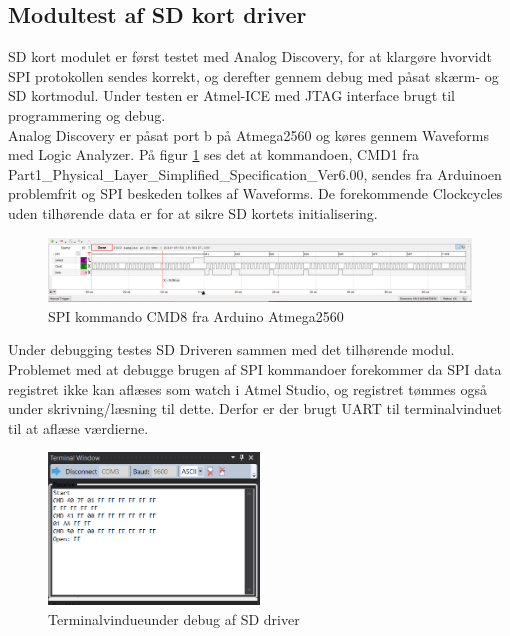 \subsection{Modultest af SD kort driver}

SD kort modulet er først testet med Analog Discovery, for at klargøre hvorvidt SPI protokollen sendes korrekt, og derefter gennem debug med påsat skærm- og SD kortmodul.
Under testen er Atmel-ICE med JTAG interface brugt til programmering og debug.\\
Analog Discovery er påsat port b på Atmega2560 og køres gennem Waveforms med Logic Analyzer.
På figur \ref{fig:SPIanalog} ses det at kommandoen, CMD1 fra Part1\_Physical\_Layer\_Simplified\_Specification\_Ver6.00, sendes fra Arduinoen problemfrit og SPI beskeden tolkes af Waveforms. De forekommende Clockcycles uden tilhørende data er for at sikre SD kortets initialisering.
 
\begin{figure}[H]
	\center
	\includegraphics[width=1.0\textwidth]{Figur/SPIoutputSDTest.png}
	\caption{SPI kommando CMD8 fra Arduino Atmega2560}
	\label{fig:SPIanalog}
\end{figure}

Under debugging testes SD Driveren sammen med det tilhørende modul. Problemet med at debugge brugen af SPI kommandoer forekommer da SPI data registret ikke kan aflæses som watch i Atmel Studio, og registret tømmes også under skrivning/læsning til dette. Derfor er der brugt UART til terminalvinduet til at aflæse værdierne.

\begin{figure}[H]
	\center
	\includegraphics[width=0.5\textwidth]{Figur/SDuartOpen.png}
	\caption{Terminalvindueunder debug af SD driver}
	\label{fig:SDopen}
\end{figure}


